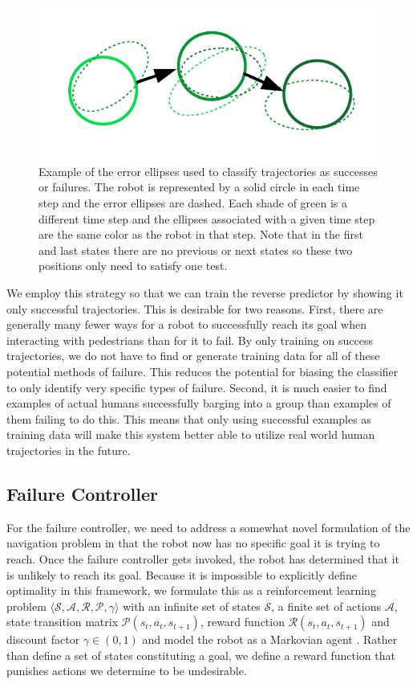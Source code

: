 \documentclass[letterpaper, 10 pt, conference]{ieeeconf}  %
\begin{document}
		\begin{figure}
			\centering
			\includegraphics[width=\linewidth]{success_ellipses}
			\caption{Example of the error ellipses used to classify trajectories as successes or failures. The robot is represented by a solid circle in each time step and the error ellipses are dashed. Each shade of green is a different time step and the ellipses associated with a given time step are the same color as the robot in that step. Note that in the first and last states there are no previous or next states so these two positions only need to satisfy one test.}
			\label{fig:success_ellipses}
		\end{figure}
	
		We employ this strategy so that we can train the reverse predictor by showing it only successful trajectories. This is desirable for two reasons. First, there are generally many fewer ways for a robot to successfully reach its goal when interacting with pedestrians than for it to fail. By only training on success trajectories, we do not have to find or generate training data for all of these potential methods of failure. This reduces the potential for biasing the classifier to only identify very specific types of failure. Second, it is much easier to find examples of actual humans successfully barging into a group than examples of them failing to do this. This means that only using successful examples as training data will make this system better able to utilize real world human trajectories in the future.
	
	\subsection{Failure Controller}
		For the failure controller, we need to address a somewhat novel formulation of the navigation problem in that the robot now has no specific goal it is trying to reach. Once the failure controller gets invoked, the robot has determined that it is unlikely to reach its goal. Because it is impossible to explicitly define optimality in this framework, we formulate this as a reinforcement learning problem $\langle\mathcal{S}, \mathcal{A}, \mathcal{R}, \mathcal{P}, \gamma\rangle$ with an infinite set of states $\mathcal{S}$, a finite set of actions $\mathcal{A}$, state transition matrix $\mathcal{P}(s_t, a_t, s_{t+1})$, reward function $\mathcal{R}(s_t, a_t, s_{t+1})$ and discount factor $\gamma \in (0, 1)$ and model the robot as a Markovian agent \cite{suttonandbarto}. Rather than define a set of states constituting a goal, we define a reward function that punishes actions we determine to be undesirable. 
		
\end{document}
